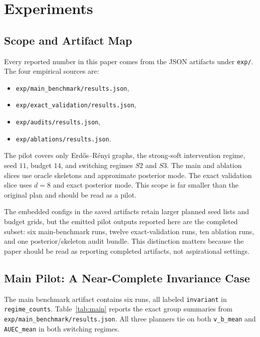 \documentclass[10pt]{article}
\begin{document}
\section{Experiments}
\label{sec:experiments}

\subsection{Scope and Artifact Map}
Every reported number in this paper comes from the JSON artifacts under \texttt{exp/}. The four empirical sources are:
\begin{itemize}[leftmargin=1.1em]
  \item \texttt{exp/main\_benchmark/results.json},
  \item \texttt{exp/exact\_validation/results.json},
  \item \texttt{exp/audits/results.json},
  \item \texttt{exp/ablations/results.json}.
\end{itemize}

The pilot covers only Erd\H{o}s--R\'enyi graphs, the strong-soft intervention regime, seed $11$, budget $14$, and switching regimes $S2$ and $S3$. The main and ablation slices use oracle skeletons and approximate posterior mode. The exact validation slice uses $d=8$ and exact posterior mode. This scope is far smaller than the original plan and should be read as a pilot.

The embedded configs in the saved artifacts retain larger planned seed lists and budget grids, but the emitted pilot outputs reported here are the completed subset: six main-benchmark runs, twelve exact-validation runs, ten ablation runs, and one posterior/skeleton audit bundle. This distinction matters because the paper should be read as reporting completed artifacts, not aspirational settings.

\subsection{Main Pilot: A Near-Complete Invariance Case}
The main benchmark artifact contains six runs, all labeled \texttt{invariant} in \texttt{regime\_counts}. Table~\ref{tab:main} reports the exact group summaries from \texttt{exp/main\_benchmark/results.json}. All three planners tie on both \texttt{v\_b\_mean} and \texttt{AUEC\_mean} in both switching regimes.
\end{document}
